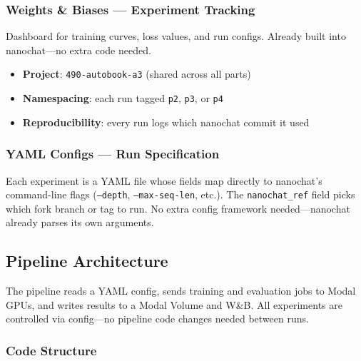 \subsubsection{Weights \& Biases --- Experiment Tracking}

Dashboard for training curves, loss values, and run configs. Already built into nanochat---no extra code needed.

\begin{itemize}[nosep]
  \item \textbf{Project}: \texttt{490-autobook-a3} (shared across all parts)
  \item \textbf{Namespacing}: each run tagged \texttt{p2}, \texttt{p3}, or \texttt{p4}
  \item \textbf{Reproducibility}: every run logs which nanochat commit it used
\end{itemize}

\subsubsection{YAML Configs --- Run Specification}

Each experiment is a YAML file whose fields map directly to nanochat's command-line flags (\texttt{--depth}, \texttt{--max-seq-len}, etc.). The \texttt{nanochat\_ref} field picks which fork branch or tag to run. No extra config framework needed---nanochat already parses its own arguments.

\subsection{Pipeline Architecture}

The pipeline reads a YAML config, sends training and evaluation jobs to Modal GPUs, and writes results to a Modal Volume and W\&B. All experiments are controlled via config---no pipeline code changes needed between runs.

\subsubsection{Code Structure}

